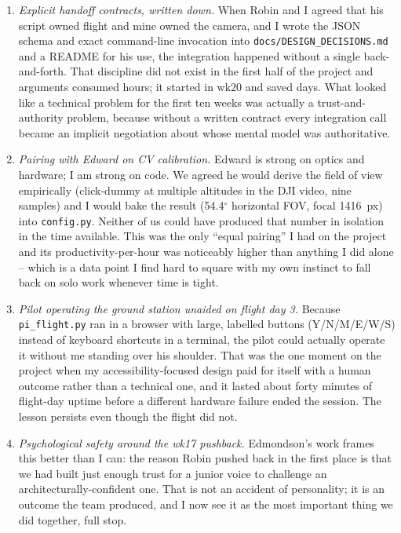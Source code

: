 \begin{enumerate}
\item \textit{Explicit handoff contracts, written down.} When Robin and I agreed that his script owned flight and mine owned the camera, and I wrote the JSON schema and exact command-line invocation into \texttt{docs/DESIGN\_DECISIONS.md} and a README for his use, the integration happened without a single back-and-forth. That discipline did not exist in the first half of the project and arguments consumed hours; it started in wk20 and saved days. What looked like a technical problem for the first ten weeks was actually a trust-and-authority problem, because without a written contract every integration call became an implicit negotiation about whose mental model was authoritative.
\item \textit{Pairing with Edward on CV calibration.} Edward is strong on optics and hardware; I am strong on code. We agreed he would derive the field of view empirically (click-dummy at multiple altitudes in the DJI video, nine samples) and I would bake the result (54.4$^\circ$ horizontal FOV, focal 1416~px) into \texttt{config.py}. Neither of us could have produced that number in isolation in the time available. This was the only ``equal pairing'' I had on the project and its productivity-per-hour was noticeably higher than anything I did alone -- which is a data point I find hard to square with my own instinct to fall back on solo work whenever time is tight.
\item \textit{Pilot operating the ground station unaided on flight day 3.} Because \texttt{pi\_flight.py} ran in a browser with large, labelled buttons (Y/N/M/E/W/S) instead of keyboard shortcuts in a terminal, the pilot could actually operate it without me standing over his shoulder. That was the one moment on the project when my accessibility-focused design paid for itself with a human outcome rather than a technical one, and it lasted about forty minutes of flight-day uptime before a different hardware failure ended the session. The lesson persists even though the flight did not.
\item \textit{Psychological safety around the wk17 pushback.} Edmondson's work \cite{edmondson1999psychsafety} frames this better than I can: the reason Robin pushed back in the first place is that we had built just enough trust for a junior voice to challenge an architecturally-confident one. That is not an accident of personality; it is an outcome the team produced, and I now see it as the most important thing we did together, full stop.
\end{enumerate}

